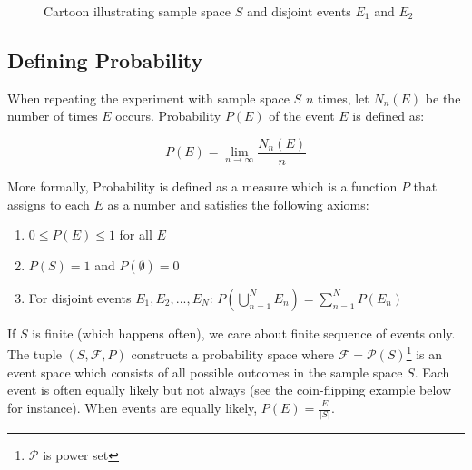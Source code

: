 \begin{figure}[H]
	\centering
	\caption{Cartoon illustrating sample space $S$ and disjoint events $E_1$ and $E_2$}
\end{figure}

\subsection{Defining Probability}

When repeating the experiment with sample space $S$ $n$ times, let $N_n (E)$ be the number of times $E$ occurs. Probability $P(E)$ of the event $E$ is defined as:

$$\displaystyle P(E) = \lim_{n \to \infty} \frac{N_n (E)}{n}$$

More formally, Probability is defined as a measure which is a function $P$ that assigns to each $E$ as a number and satisfies the following axioms:

\begin{enumerate}[i]
	\item $0 \le P(E) \le 1$ for all $E$
	\item $P(S)=1$ and $P(\emptyset)=0$
	\item For disjoint events $E_1, E_2, ..., E_N$: $\displaystyle P\left( \bigcup_{n=1}^N E_n \right)=\sum_{n=1}^N P(E_n)$
\end{enumerate}

If $S$ is finite (which happens often), we care about finite sequence of events only. The tuple $(S,\mathcal{F},P)$ constructs a probability space where $\mathcal{F}=\mathcal{P}(S)$\footnote{$\mathcal{P}$ is power set} is an event space which consists of all possible outcomes in the sample space $S$. Each event is often equally likely but not always (see the coin-flipping example below for instance). When events are equally likely, $P(E)=\frac{|E|}{|S|}$.

